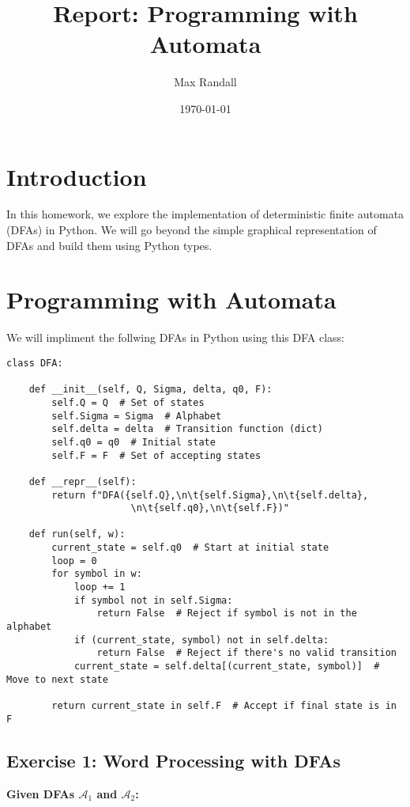 \documentclass{article}
\title{\textbf{Report: Programming with Automata}}
\author{Max Randall}
\date{\today}
\begin{document}
\maketitle

\tableofcontents

\section{Introduction}
In this homework, we explore the implementation of deterministic finite automata (DFAs) in Python. 
We will go beyond the simple graphical representation of DFAs and build them using Python types.

\newpage

\section{Programming with Automata}
We will impliment the follwing DFAs in Python using this DFA class:

\begin{verbatim}
class DFA:

    def __init__(self, Q, Sigma, delta, q0, F):
        self.Q = Q  # Set of states
        self.Sigma = Sigma  # Alphabet
        self.delta = delta  # Transition function (dict)
        self.q0 = q0  # Initial state
        self.F = F  # Set of accepting states

    def __repr__(self):
        return f"DFA({self.Q},\n\t{self.Sigma},\n\t{self.delta},
                      \n\t{self.q0},\n\t{self.F})"

    def run(self, w):
        current_state = self.q0  # Start at initial state
        loop = 0
        for symbol in w:
            loop += 1
            if symbol not in self.Sigma:
                return False  # Reject if symbol is not in the alphabet
            if (current_state, symbol) not in self.delta:
                return False  # Reject if there's no valid transition
            current_state = self.delta[(current_state, symbol)]  # Move to next state
        
        return current_state in self.F  # Accept if final state is in F
\end{verbatim}

\newpage

\subsection*{Exercise 1: Word Processing with DFAs}
\textbf{Given DFAs $\mathcal{A}_1$ and $\mathcal{A}_2$:}
\end{document}
